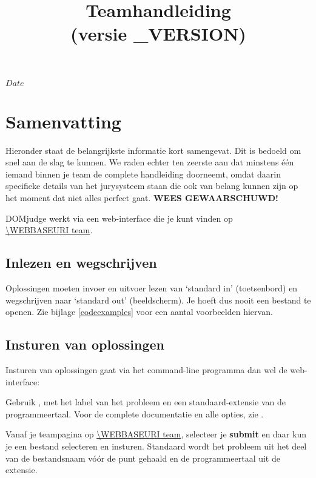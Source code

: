 

\usepackage[dutch]{babel}

\SVNdate $Date$

\title{Teamhandleiding \DOMjudge\\(versie \DOMJUDGE_VERSION)}



\begin{titlepage}
\maketitle
\end{titlepage}

\newpage

\section*{Samenvatting}

Hieronder staat de belangrijkste informatie kort samengevat. Dit is
bedoeld om snel aan de slag te kunnen. We raden echter ten zeerste
aan dat minstens \'e\'en iemand binnen je team de complete handleiding
doorneemt, omdat daarin specifieke details van het jurysysteem staan
die ook van belang kunnen zijn op het moment dat niet alles perfect
gaat. \textbf{WEES GEWAARSCHUWD!}

DOMjudge werkt via een web-interface die je kunt vinden op \\
\url{\WEBBASEURI team}.

\subsection*{Inlezen en wegschrijven}

Oplossingen moeten invoer en uitvoer lezen van `standard in'
(toetsenbord) en wegschrijven naar `standard out' (beeldscherm).
Je hoeft dus nooit een bestand te openen. Zie bijlage
\ref{codeexamples} voor een aantal voorbeelden hiervan.

\subsection*{Insturen van oplossingen}

Insturen van oplossingen gaat via het command-line programma
 dan wel de web-interface:
\begin{description}[\breaklabel\setlabelstyle{\bfseries}]
\item[Command-line] 
Gebruik , met  het
label van het probleem en  een standaard-extensie van
de programmeertaal. Voor de complete documentatie en alle opties, zie .
\item[Web-Interface]
Vanaf je teampagina op \url{\WEBBASEURI team}, selecteer je
\textbf{submit} en daar kun je een bestand selecteren en insturen.
Standaard wordt het probleem uit het deel van de bestandsnaam v\'o\'or de
punt gehaald en de programmeertaal uit de extensie.

\end{description}

